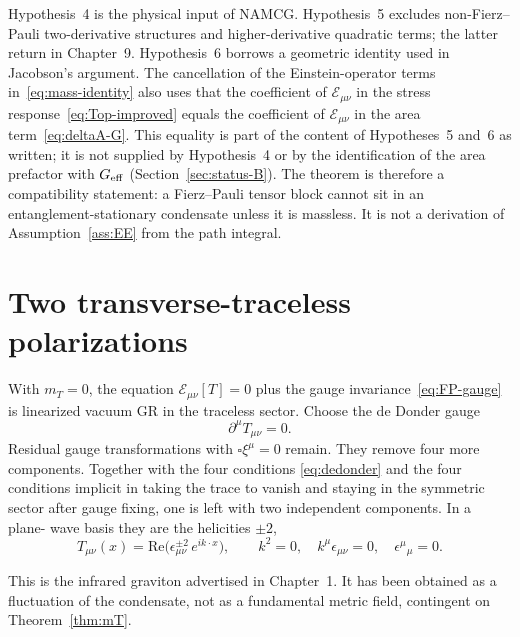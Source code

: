 \begin{remark}
  Hypothesis~4 is the physical input of NAMCG. Hypothesis~5 excludes
  non-Fierz--Pauli two-derivative structures and higher-derivative
  quadratic terms; the latter return in Chapter~9. Hypothesis~6
  borrows a geometric identity used in Jacobson's argument. The cancellation of the Einstein-operator terms
in~\eqref{eq:mass-identity} also uses that the coefficient of
\(\mathcal E_{\mu\nu}\) in the stress response~\eqref{eq:Top-improved}
equals the coefficient of \(\mathcal E_{\mu\nu}\) in the area
term~\eqref{eq:deltaA-G}. This equality is part of the content of
Hypotheses~5 and~6 as written; it is not supplied by Hypothesis~4 or by the
identification of the area prefactor with \(G_{\mathrm{eff}}\)
(Section~\ref{sec:status-B}). The
  theorem is therefore a compatibility statement: a Fierz--Pauli
  tensor block cannot sit in an entanglement-stationary condensate
  unless it is massless. It is not a derivation of
  Assumption~\ref{ass:EE} from the path integral.
\end{remark}

\section{Two transverse-traceless polarizations}
\label{sec:ch7-TT}

With \(m_T=0\), the equation \(\mathcal{E}_{\mu\nu}[T]=0\) plus the
gauge invariance~\eqref{eq:FP-gauge} is linearized vacuum GR in the
traceless sector. Choose the de Donder gauge
\begin{equation}
  \label{eq:dedonder}
  \partial^\mu T_{\mu\nu}=0.
\end{equation}
Residual gauge transformations with \(\square\xi^\mu=0\) remain.
They remove four more components. Together with the four conditions
\eqref{eq:dedonder} and the four conditions implicit in taking the
trace to vanish and staying in the symmetric sector after gauge
fixing, one is left with two independent components. In a plane-
wave basis they are the helicities \(\pm 2\),
\begin{equation}
  \label{eq:TT-wave}
  T_{\mu\nu}(x)
  =\mathrm{Re}\bigl(
     \epsilon_{\mu\nu}^{\pm 2}\,
     e^{ik\cdot x}
   \bigr),
  \qquad
  k^2=0,
  \quad
  k^\mu\epsilon_{\mu\nu}=0,
  \quad
  \epsilon^\mu{}_\mu=0.
\end{equation}

This is the infrared graviton advertised in Chapter~1. It has been
obtained as a fluctuation of the condensate, not as a fundamental
metric field, contingent on Theorem~\ref{thm:mT}.

